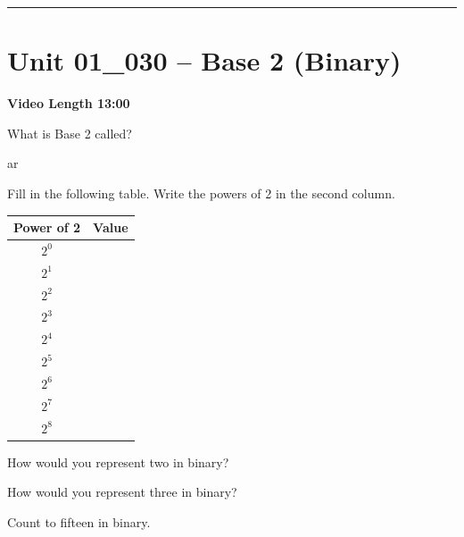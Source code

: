\documentclass[letterpaper,12pt]{exam}
\newcommand{\unit}{Unit 01}
\begin{document}
\begin{questions}
\rule{0.5\textwidth}{.4pt} %

\section*{\unit\_030 -- Base 2 (Binary) }
\par{\selectfont\textbf{Video Length 13:00}}
\begin{samepage}
    \question What is Base 2 called?
    \vspace{5mm}
\end{samepage}
ar

Fill in the following table.  Write the powers of 2 in the second column.

\begin{Large}
\begin{tabular}{| c | c |}

 \hline
    Power of 2& Value \\
    \hline
 $2^0 $ &  \\
 \hline 
$2^1 $ &  \\
 \hline 
$2^2 $ &  \\
 \hline 
$2^3 $ &  \\
 \hline 
$2^4 $ &  \\
 \hline 
$2^5 $ &  \\
 \hline 
$2^6 $ &  \\
 \hline 
$2^7 $ &  \\
 \hline 
$2^8 $ &  \\
 \hline 

\end{tabular}
\end{Large}
\begin{samepage}
    \question How would you represent two in binary?
    \vspace{5mm}
\end{samepage}
\newpage
 
\begin{samepage}
    \question How would you represent three in binary?
    \vspace{5mm}
\end{samepage}

\begin{samepage}
    \question Count to fifteen in binary.
    \par
\begin{huge}
\begin{tabular}{| c | c |}


\end{tabular}
\end{huge}
\end{samepage}
\end{questions}
\end{document}
